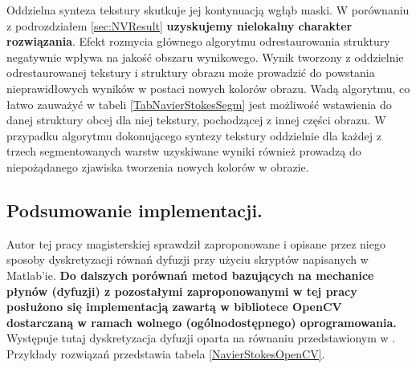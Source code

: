 \documentclass[a4paper,12pt,twoside,openany]{report}
\begin{document}
Oddzielna synteza tekstury skutkuje jej kontynuacją wgłąb maski. W porównaniu z podrozdziałem \ref{sec:NVResult} \textbf{uzyskujemy nielokalny charakter rozwiązania}. Efekt rozmycia głównego algorytmu odrestaurowania struktury negatywnie wpływa na jakość obszaru wynikowego. Wynik tworzony z oddzielnie odrestaurowanej tekstury i struktury obrazu może prowadzić do powstania nieprawidłowych wyników w postaci nowych kolorów obrazu. Wadą algorytmu, co łatwo zauważyć w tabeli \ref{TabNavierStokesSegm} jest możliwość wstawienia do danej struktury obcej dla niej tekstury, pochodzącej z innej części obrazu.  W przypadku algorytmu dokonującego syntezy tekstury oddzielnie dla każdej z trzech segmentowanych warstw uzyskiwane wyniki również prowadzą do niepożądanego zjawiska tworzenia nowych kolorów w obrazie.
\subsection{Podsumowanie implementacji.}
Autor tej pracy magisterskiej sprawdził zaproponowane i opisane przez niego sposoby dyskretyzacji równań dyfuzji przy użyciu skryptów napisanych w Matlab'ie. \textbf{Do dalszych porównań metod bazujących na mechanice płynów (dyfuzji) z pozostałymi zaproponowanymi w tej pracy posłużono się implementacją zawartą w bibliotece OpenCV dostarczaną w ramach wolnego (ogólnodostępnego) oprogramowania.} Występuje tutaj dyskretyzacja dyfuzji oparta na równaniu przedstawionym w \cite{BertalmioNavierStokes}. Przykłady rozwiązań przedstawia tabela \ref{NavierStokesOpenCV}.
\end{document}
